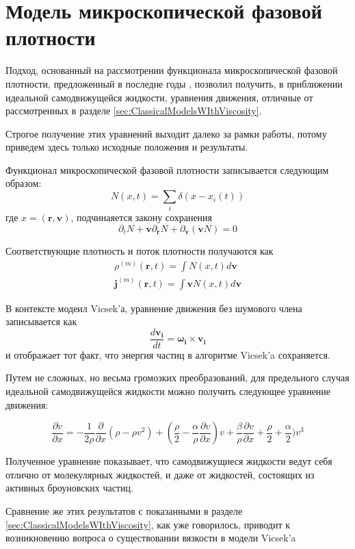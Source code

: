 \section{Модель микроскопической фазовой плотности} %
\label{sec:KulinskyModel}

	Подход, основанный на рассмотрении функционала микроскопической фазовой плотности, предложенный в последне годы \cite{chepizhko2013,kulinskii2012}, позволил получить, в приближении идеальной самодвижущейся жидкости, уравнения движения, отличные от рассмотренных в разделе \ref{sec:ClassicalModelsWIthViscosity}.

	Строгое получение этих уравнений выходит далеко за рамки работы, потому приведем здесь только исходные положения и результаты.

	Функционал микроскопической фазовой плотности записывается следующим образом:
	\begin{equation}
		N(x,t) = \sum_i \delta(x-x_i(t))
	\end{equation}
	где $x = (\boldsymbol{r}, \boldsymbol{v})$, подчинаяется закону сохранения
	\begin{equation}
		\partial_t N  + \boldsymbol{v} \partial_{\boldsymbol{r}} N + \partial_{\boldsymbol{v}} (\boldsymbol{\dot{v}} N) = 0
	\end{equation}

	Соответствующие плотность и поток плотности получаются как
	\begin{align}
		\rho^{(m)}(\boldsymbol{r},t) = \int N(x,t)d \boldsymbol{v}
		\\
		\boldsymbol{j}^{(m)}(\boldsymbol{r},t) = \int \boldsymbol{v} N(x,t)d \boldsymbol{v}
	\end{align}

	В контексте модеил Vicsek'а, уравнение движения без шумового члена записывается как
	\begin{equation}
		\frac{d \boldsymbol{v_i}}{dt} = \boldsymbol{\omega_i} \times \boldsymbol{v_i}
	\end{equation}
	и отображает тот факт, что энергия частиц в алгоритме Vicsek'a сохраняется.

	Путем не сложных, но весьма громозких преобразований, для предельного случая идеальной самодвижущейся жидкости можно получить следующее уравнение движения:

	\begin{equation}
	\label{eq:KulinsciiEqOfMotion}
		\frac{\partial v}{\partial x} = -\frac{1}{2 \rho} \frac{\partial}{\partial x} (\rho -\rho v^2)+(\frac{\rho}{2} - \frac{\alpha}{\rho} \frac{\partial v}{\partial x})v + \frac{\beta}{\rho} \frac{\partial v}{\partial x} + \frac{\rho}{2} + \frac{\alpha}{2}) v^3
	\end{equation}

	Полученное уравнение показывает, что самодвижущиеся жидкости ведут себя отлично от молекулярных жидкостей, и даже от жидкостей, состоящих из активных броуновских частиц.

	Сравнение же этих результатов с показанными в разделе \ref{sec:ClassicalModelsWIthViscosity}, как уже говорилось, приводит к возникновению вопроса о существовании вязкости в модели Vicsek'a
